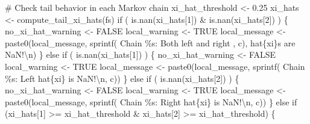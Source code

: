 \documentclass[
  letterpaper,
  DIV=11,
  numbers=noendperiod]{scrartcl}
\newenvironment{Shaded}{\begin{snugshade}}{\end{snugshade}}
\newcommand{\CommentTok}[1]{\textcolor[rgb]{0.37,0.37,0.37}{#1}}
\newcommand{\ConstantTok}[1]{\textcolor[rgb]{0.56,0.35,0.01}{#1}}
\newcommand{\ControlFlowTok}[1]{\textcolor[rgb]{0.00,0.23,0.31}{#1}}
\newcommand{\DecValTok}[1]{\textcolor[rgb]{0.68,0.00,0.00}{#1}}
\newcommand{\FloatTok}[1]{\textcolor[rgb]{0.68,0.00,0.00}{#1}}
\newcommand{\FunctionTok}[1]{\textcolor[rgb]{0.28,0.35,0.67}{#1}}
\newcommand{\NormalTok}[1]{\textcolor[rgb]{0.00,0.23,0.31}{#1}}
\newcommand{\OtherTok}[1]{\textcolor[rgb]{0.00,0.23,0.31}{#1}}
\newcommand{\SpecialCharTok}[1]{\textcolor[rgb]{0.37,0.37,0.37}{#1}}
\newcommand{\StringTok}[1]{\textcolor[rgb]{0.13,0.47,0.30}{#1}}
\begin{document}
\begin{Shaded}
\begin{Highlighting}[]
      \CommentTok{\# Check tail behavior in each Markov chain}
\NormalTok{      xi\_hat\_threshold }\OtherTok{\textless{}{-}} \FloatTok{0.25}
\NormalTok{      xi\_hats }\OtherTok{\textless{}{-}} \FunctionTok{compute\_tail\_xi\_hats}\NormalTok{(fs)}
      \ControlFlowTok{if}\NormalTok{ ( }\FunctionTok{is.nan}\NormalTok{(xi\_hats[}\DecValTok{1}\NormalTok{]) }\SpecialCharTok{\&} \FunctionTok{is.nan}\NormalTok{(xi\_hats[}\DecValTok{2}\NormalTok{]) ) \{}
\NormalTok{        no\_xi\_hat\_warning }\OtherTok{\textless{}{-}} \ConstantTok{FALSE}
\NormalTok{        local\_warning }\OtherTok{\textless{}{-}} \ConstantTok{TRUE}
\NormalTok{        local\_message }\OtherTok{\textless{}{-}}
          \FunctionTok{paste0}\NormalTok{(local\_message,}
                 \FunctionTok{sprintf}\NormalTok{(}\StringTok{\textquotesingle{}  Chain \%s: Both left and right \textquotesingle{}}\NormalTok{, c),}
                 \StringTok{\textquotesingle{}hat\{xi\}s are NaN!}\SpecialCharTok{\textbackslash{}n}\StringTok{\textquotesingle{}}\NormalTok{)}
\NormalTok{      \} }
      \ControlFlowTok{else} \ControlFlowTok{if}\NormalTok{ ( }\FunctionTok{is.nan}\NormalTok{(xi\_hats[}\DecValTok{1}\NormalTok{]) ) \{}
\NormalTok{        no\_xi\_hat\_warning }\OtherTok{\textless{}{-}} \ConstantTok{FALSE}
\NormalTok{        local\_warning }\OtherTok{\textless{}{-}} \ConstantTok{TRUE}
\NormalTok{        local\_message }\OtherTok{\textless{}{-}}
          \FunctionTok{paste0}\NormalTok{(local\_message,}
                 \FunctionTok{sprintf}\NormalTok{(}\StringTok{\textquotesingle{}  Chain \%s: Left hat\{xi\} is NaN!}\SpecialCharTok{\textbackslash{}n}\StringTok{\textquotesingle{}}\NormalTok{, c))}
\NormalTok{      \} }\ControlFlowTok{else} \ControlFlowTok{if}\NormalTok{ ( }\FunctionTok{is.nan}\NormalTok{(xi\_hats[}\DecValTok{2}\NormalTok{]) ) \{}
\NormalTok{        no\_xi\_hat\_warning }\OtherTok{\textless{}{-}} \ConstantTok{FALSE}
\NormalTok{        local\_warning }\OtherTok{\textless{}{-}} \ConstantTok{TRUE}
\NormalTok{        local\_message }\OtherTok{\textless{}{-}}
          \FunctionTok{paste0}\NormalTok{(local\_message,}
                 \FunctionTok{sprintf}\NormalTok{(}\StringTok{\textquotesingle{}  Chain \%s: Right hat\{xi\} is NaN!}\SpecialCharTok{\textbackslash{}n}\StringTok{\textquotesingle{}}\NormalTok{, c))}
\NormalTok{      \} }\ControlFlowTok{else} \ControlFlowTok{if}\NormalTok{ (xi\_hats[}\DecValTok{1}\NormalTok{] }\SpecialCharTok{\textgreater{}=}\NormalTok{ xi\_hat\_threshold }\SpecialCharTok{\&} 
\NormalTok{          xi\_hats[}\DecValTok{2}\NormalTok{] }\SpecialCharTok{\textgreater{}=}\NormalTok{ xi\_hat\_threshold) \{}

\end{Highlighting}
\end{Shaded}
\end{document}
